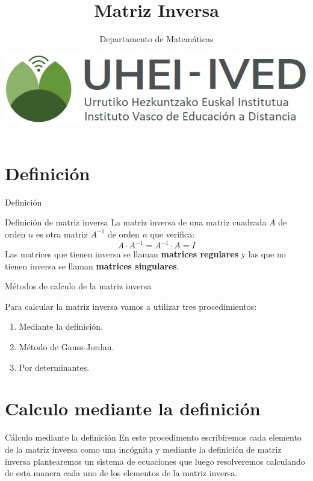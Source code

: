 \documentclass[9pt]{beamer}
\author{Departamento de Matemáticas}
\title{Matriz Inversa}
\date{\includegraphics[scale=0.15]{imagenes/logoa.jpg}}
\begin{document}
\begin{frame}
\titlepage
\end{frame}

\begin{frame}
\tableofcontents
\end{frame}

\section{Definición}

\begin{frame}{Definición}

\begin{alertblock}{Definición de matriz inversa}
La matriz inversa de una matriz cuadrada $A$ de orden $n$ es otra matriz $A^{-1}$ de orden $n$ que verifica:
\[
A\cdot A^{-1}=A^{-1} \cdot A = I
\]
Las matrices que tienen inversa se llaman \textbf{matrices regulares} y las que no tienen inversa se llaman \textbf{matrices singulares}.
\end{alertblock}
\end{frame}


\begin{frame}{Métodos de calculo de la matriz inversa}

Para calcular la matriz inversa vamos a utilizar tres procedimientos:
\begin{enumerate}[<+-|alert@+>]
\item Mediante la definición.
\item Método de Gauss-Jordan.
\item Por determinantes.
\end{enumerate}

\end{frame}

\section{Calculo mediante la definición}

\begin{frame}{Cálculo mediante la definición}
En este procedimento escribiremos cada elemento de la matriz inversa como una incógnita y mediante la definición de matriz inversa plantearemos un sistema de ecuaciones que luego resolveremos calculando de esta manera cada uno de los elementos de la matriz inversa.

\end{frame}
\end{document}
